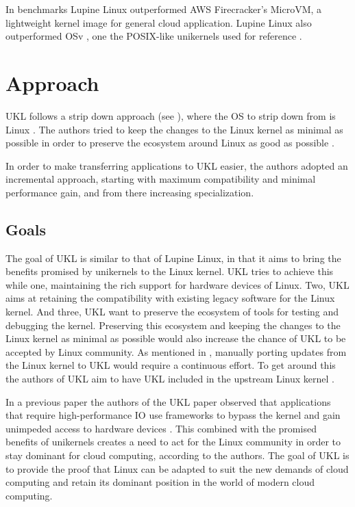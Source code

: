 \documentclass[10pt,twocolumn,a4paper]{article}
\begin{document}
    In benchmarks Lupine Linux outperformed AWS Firecracker's MicroVM, a lightweight 
    kernel image for general cloud application. 
    Lupine Linux also outperformed OSv \cite{osv}, 
    one the POSIX-like unikernels used for reference \cite{kuo20}.

\section{Approach}\label{sec:approach}
  UKL follows a strip down approach (see ),
  where the OS to strip down from is Linux \cite{raza23}.
  The authors tried to keep the changes to the Linux kernel as minimal as possible
  in order to preserve the ecosystem around Linux as good as possible \cite{raza23}.

  In order to make transferring applications to UKL easier, the authors adopted an incremental approach,
  starting with maximum compatibility and minimal performance gain, and from there increasing specialization.

  \subsection{Goals}\label{sec:goals}
    The goal of UKL is similar to that of Lupine Linux, in that it aims
    to bring the benefits promised by unikernels to the Linux kernel.
    UKL tries to achieve this while one, maintaining the rich support for hardware devices of Linux.
    Two, UKL aims at retaining the compatibility with existing legacy software for the Linux kernel.
    And three, UKL want to preserve the ecosystem of tools for testing and debugging the kernel.
    Preserving this ecosystem and keeping the changes to the Linux kernel as minimal as possible
    would also increase the chance of UKL to be accepted by Linux community.
    As mentioned in , manually porting updates from
    the Linux kernel to UKL would require a continuous effort.
    To get around this the authors of UKL aim to have UKL included in the upstream Linux kernel
    \cite{ukl-redhat-post}.

    In a previous paper \cite{raza19} the authors of the UKL paper \cite{raza23}
    observed that applications that require high-performance IO use frameworks
    to bypass the kernel and gain unimpeded access to hardware devices \cite{raza19}.
    This combined with the promised benefits of unikernels creates a need to act
    for the Linux community in order to stay dominant for cloud computing, according to the authors.
    The goal of UKL is to provide the proof that Linux can be adapted to suit the new demands of
    cloud computing and retain its dominant position in the world of modern cloud computing.
\end{document}
